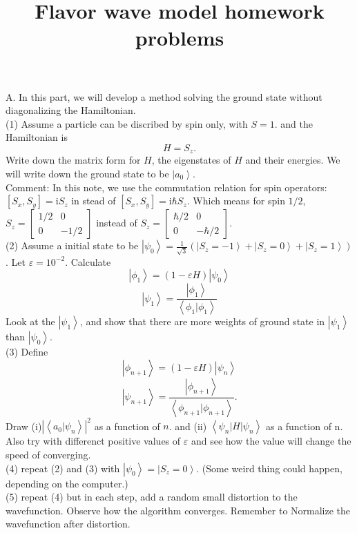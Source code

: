 \documentclass[letter]{article}
\title{{\myfont Flavor wave model homework problems}}
\newcommand{\ii}{\mathrm{i}}
\begin{document}
\maketitle
{\large{A}}. In this part, we will develop a method solving the ground state without diagonalizing the Hamiltonian.\\
\indent (1)  Assume a particle can be discribed by spin only, with $S=1$. and the Hamiltonian is 
$$ H= S_z.
$$
Write down the matrix form for $H$, the eigenstates of $H$ and their energies. We will write down the ground state to be $\left|a_0\right>$.\\
\indent Comment: In this note, we use the commutation relation for spin operators: $[S_x,S_y]=\ii S_z$ in stead of $[S_x,S_y]=\ii \hbar S_z$. Which means for spin $1/2$, $S_z=\begin{bmatrix}
    1/2 & 0 \\
    0 &  -1/2
    \end{bmatrix}$ instead of $ S_z=\begin{bmatrix}
        \hbar/2 & 0 \\
        0 &  -\hbar/2
        \end{bmatrix}$. \\
\indent (2) Assume a initial state to be $\left|\psi_0\right>=\frac{1}{\sqrt{3}}(\left|S_z=-1\right>+\left|S_z=0\right>+\left|S_z=1\right>)$. Let $\varepsilon=10^{-2}$. Calculate 
$$\left|\phi_1\right>=\left(1-\varepsilon H \right)\left|\psi_0\right>$$
$$\left|\psi_1\right>=\frac{\left|\phi_1\right>}{\left<\phi_1|\phi_1\right>}$$
Look at the $\left|\psi_1\right>$, and show that  there are more weights of ground state in $\left|\psi_1\right>$ than $\left|\psi_0\right>$.\\
\indent (3) Define 
$$\left|\phi_{n+1}\right>=\left(1-\varepsilon H\right) \left|\psi_n\right>$$
$$\left|\psi_{n+1}\right>=\frac{\left|\phi_{n+1}\right>}{\left<\phi_{n+1}|\phi_{n+1}\right>}.$$
Draw (i)$\left|\left<a_0|\psi_n\right>\right|^2$ as a function of $n$. and 
(ii) $\left<\psi_n|H|\psi_n\right>$ as a function of n. Also try with differenct positive values of $\varepsilon$ and see how the value will change the speed of converging.\\
\indent (4) repeat (2) and (3) with $\left|\psi_0\right>=\left|S_z=0\right>$. (Some weird thing could happen, depending on the computer.)\\ 
\indent (5) repeat (4) but in each step, add a random small distortion to the wavefunction. Observe how the algorithm converges. Remember to Normalize the wavefunction after distortion.\\ 
\end{document}
